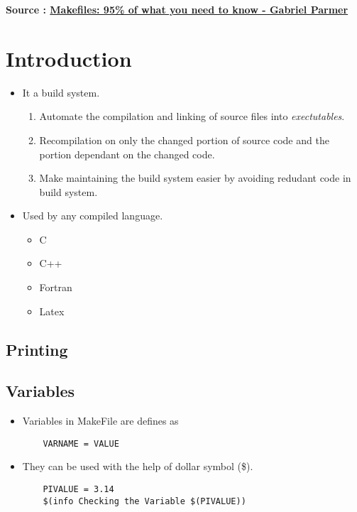 \documentclass{article}
\begin{document}
\large

\textbf{Source : \href{https://youtu.be/DtGrdB8wQ_8}{Makefiles: 95\% of what you need to know - Gabriel Parmer}}

\section{Introduction}
\begin{itemize}
    \item It a build system.
          \begin{enumerate}[label=\roman*)]
              \item Automate the compilation and linking of source files into \emph{exectutables}.
              \item Recompilation on only the changed portion of source code and the portion dependant on the changed code.
              \item Make maintaining the build system easier by avoiding redudant code in build system.
          \end{enumerate}
    \item Used by any compiled language.
          \begin{itemize}
              \item C
              \item C++
              \item Fortran
              \item Latex
          \end{itemize}
\end{itemize}

\subsection{Printing}


\subsection{Variables}
\begin{itemize}
    \item Variables in MakeFile are defines as
          \begin{verbatim}
    VARNAME = VALUE
    \end{verbatim}
    \item They can be used with the help of dollar symbol (\$).
          \begin{verbatim}
    PIVALUE = 3.14
    $(info Checking the Variable $(PIVALUE)) 
    \end{verbatim}
\end{itemize}
\end{document}
